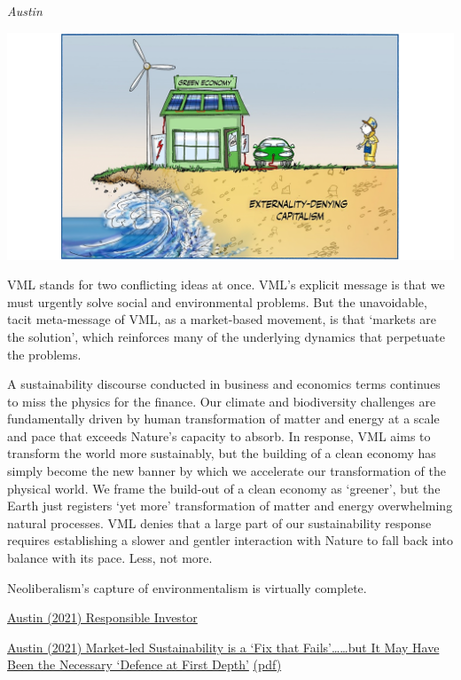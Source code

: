 \documentclass[
]{book}
\begin{document}
\emph{Austin}

\includegraphics{fig/Market_Led _sustainability_is_a_fix_that_fails.png}

VML stands for two conflicting ideas at once. VML's explicit message is that we must urgently solve social and environmental problems. But the unavoidable, tacit meta-message of VML, as a market-based movement, is that `markets are the solution', which reinforces many of the underlying dynamics that perpetuate the problems.

A sustainability discourse conducted in business and economics terms continues to miss the physics for the finance. Our climate and biodiversity challenges are fundamentally driven by human transformation of matter and energy at a scale and pace that exceeds Nature's capacity to absorb. In response, VML aims to transform the world more sustainably, but the building of a clean economy has simply become the new banner by which we accelerate our transformation of the physical world. We frame the build-out of a clean economy as `greener', but the Earth just registers `yet more' transformation of matter and energy overwhelming natural processes. VML denies that a large part of our sustainability response requires establishing a slower and gentler interaction with Nature to fall back into balance with its pace. Less, not more.

Neoliberalism's capture of environmentalism is virtually complete.

\href{https://www.responsible-investor.com/articles/market-led-sustainability-is-a-fix-that-fails}{Austin (2021) Responsible Investor}

\href{https://bothbrainsrequired.com/2021/10/25/fix-that-fails/}{Austin (2021) Market-led Sustainability is a `Fix that Fails'\ldots\ldots but It May Have Been the Necessary `Defence at First Depth'}
\href{pdf/Austin_2021_Market_Led_Sustainability_Fix_Fails.pdf}{(pdf)}
\end{document}
